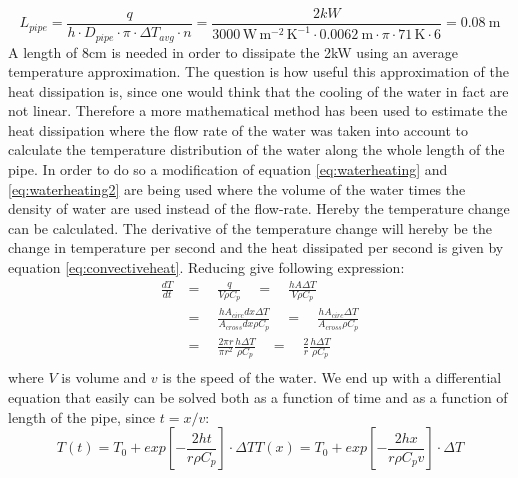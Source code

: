 \begin{equation}
L_{pipe} = \frac{q}{h\cdot D_{pipe} \cdot \pi \cdot \Delta T_{avg} \cdot n} = \frac{2kW}{3000 \, \mathrm{W \, m^{-2} \, K^{-1}} \cdot \SI{0.0062}{\metre} \cdot \pi \cdot 71 \, \mathrm{K} \cdot 6} = \SI{0.08}{\metre}
\end{equation}
A length of 8cm is needed in order to dissipate the 2kW using an average temperature approximation. The question is how useful this approximation of the heat dissipation is, since one would think that the cooling of the water in fact are not linear. Therefore a more mathematical method has been used to estimate the heat dissipation where the flow rate of the water was taken into account to calculate the temperature distribution of the water along the whole length of the pipe. In order to do so a modification of equation \ref{eq:waterheating} and \ref{eq:waterheating2} are being used where the volume of the water times the density of water are used instead of the flow-rate. Hereby the temperature change can be calculated. The derivative of the temperature change will hereby be the change in temperature per second and the heat dissipated per second is given by equation \ref{eq:convectiveheat}. Reducing give following expression:
\begin{equation}
\begin{aligned}
\frac{dT}{dt} & =  \quad {} \frac{q}{V\rho C_p} \quad = \quad \frac{hA\Delta T}{V\rho C_p}  \\
& = \quad\frac{hA_{circ} dx \Delta T}{A_{cross} dx \rho C_p}\quad =\quad \frac{hA_{circ} \Delta T}{A_{cross} \rho C_p} \\
& =\quad \frac{2\pi r}{\pi r^2} \frac{h\Delta T}{\rho C_p} \quad=\quad \frac{2}{r} \frac{h\Delta T}{\rho C_p} \\
\end{aligned}
\end{equation}
where $V$ is volume and $v$ is the speed of the water. We end up with a differential equation that easily can be solved both as a function of time and as a function of length of the pipe, since $t = x/v$: 
\begin{subequations}
\begin{equation}
T(t) =  T_0 + exp\left[-\frac{2ht}{r\rho C_p}\right]\cdot \Delta T
\end{equation}
\begin{equation}\label{eq:tdiff}
T(x) =  T_0 + exp\left[-\frac{2hx}{r\rho C_p v}\right]\cdot \Delta T
\end{equation}
\end{subequations}
